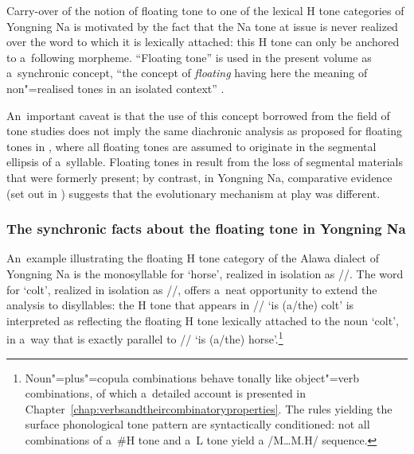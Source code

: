 Carry-over of the notion of floating tone to one of the lexical H tone categories of Yongning Na is motivated by the fact that the Na tone at issue is never realized over the word to which it is lexically attached: this H tone can only be anchored to a~following morpheme. “Floating tone” is used in the present volume as a~synchronic concept, “the concept of \textit{floating} having here the meaning of non"=realised tones in an {isolated context}” \citep[61]{some2000}. 

An~important caveat is that the use of this concept borrowed from the field of  tone studies does not imply the same {diachronic} analysis as proposed for floating tones in , where all floating tones are assumed to originate in the segmental ellipsis of a~syllable. Floating tones in  result from the loss of segmental materials that were formerly present; by contrast, in Yongning Na, {comparative evidence} (set out in ) suggests that the evolutionary mechanism at play was different.  

\subsubsection{The synchronic facts about the floating tone in Yongning Na}
\label{sec:thesynchronicfacts}

An~example illustrating the floating H tone category of the Alawa dialect of Yongning Na is the {monosyllable} for ‘horse’, realized in isolation as //. The word for ‘colt’, realized in isolation as //, offers a~neat opportunity to extend the analysis to
disyllables: the H tone that appears in // ‘is \mbox{(a/the)} colt’ is interpreted as reflecting
the floating H tone lexically attached to the noun ‘colt’, in a~way that is exactly parallel to
// ‘is \mbox{(a/the)} horse’.\footnote{Noun"=plus"={copula} combinations behave tonally like
  object"=verb combinations, of which a~detailed account is presented in Chapter~\ref{chap:verbsandtheircombinatoryproperties}. The rules
  yielding the surface phonological tone pattern are syntactically conditioned: not all
  combinations of a~\#H tone and a~L tone yield a \mbox{/M{\dots}M.H/} sequence.}

